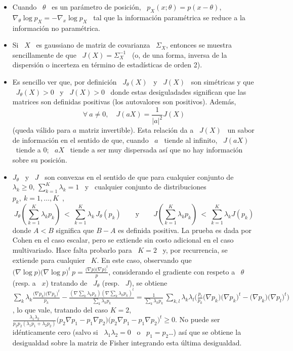 \begin{itemize}
\item Cuando  \ $\theta$ \ es  un par\'ametro de posici\'on,  \ $p_X(x;\theta) =
  p(x - \theta)$, \ $\nabla_\theta \log p_X  = - \nabla_x \log p_X$ \ tal que la
  informaci\'on param\'etrica se reduce a la informaci\'on no param\'etrica.
%
\item Si \ $X$ \ es gaussiano  de matriz de covarianza \ $\Sigma_X$, entonces se
  muestra sencillamente  de que  \ $J(X)  = \Sigma_X^{-1}$ \  (o, de  una forma,
  inversa de la dispersi\'on o incerteza en t\'ermino de estad\'isticas de orden
  2).
%
\item Es sencillo ver  que, por definici\'on \ $J_\theta(X)$ \ y  \ $J(X)$ \ son
  sim\'etricas  y  que \  $J_\theta(X)  > 0$  \  y  \ $J(X)  >  0$  \ donde  estas
  desiguladades  significan  que  las  matrices  son  definidas  positivas  (los
  autovalores son positivos).  Adem\'as,
  \[
  \forall \ a \ne 0, \quad J(aX) = \frac{1}{|a|^2} J(X)
  \]
  (queda v\'alido para $a$ matriz invertible).   Esta relaci\'on da a \ $J(X)$ \
  un sabor  de informaci\'on  en el  sentido de que,  cuando \  $a$ \  tiende al
  infinito, \ $J(aX)$ \ tiende a 0; \  $a X$ \ tiende a ser muy dispersada as\'i
  que no hay informaci\'on sobre su posici\'on.
%
\item $J_\theta$ \  y \ $J$ \ son  convexas en el sentido de  que para cualquier
  conjunto de \ $\lambda_k \ge 0, \, \sum_{k=1}^K \lambda_k = 1$ \ y \ cualquier
  conjunto de distribuciones \ $p_k, \ k = 1, \ldots , K$~\cite{Coh68, Fri04},
  \[
  J_\theta\left(  \sum_{k=1}^K  \lambda_k  p_k  \right)  \:  <  \:  \sum_{k=1}^K
  \lambda_k  \,  J_\theta\left(  p_k  \right)  \qquad  \mbox{y}  \qquad  J\left(
    \sum_{k=1}^K \lambda_k  p_k \right) \:  < \: \sum_{k=1}^K  \lambda_k J\left(
    p_k \right)
  \]
  donde $A < B$ significa que $B-A$ es definida positiva.  La prueba es dada por
  Cohen en  el caso  escalar, pero se  extiende sin  costo adicional en  el caso
  multivariado.  Hace falta  probarlo  para \  $K=2$  \ y,  por recurrencia,  se
  extiende para  cualquier \ $K$. En  este caso, observando que  \ $\big( \nabla
  \log p  \big) \big( \nabla \log  p \big)^t \,  p = \frac{\big( \nabla  p \big)
    \big(  \nabla p  \big)^t}{p}$, considerando  el  gradiente con  respeto a  \
  $\theta$ (resp. a \ $x$) tratando de  \ $J_\theta$ (resp. \ $J$), se obtiene \
  $\sum_k \lambda_k \frac{\big( \nabla  p_k \big) \big( \nabla p_k \big)^t}{p_k}
  -  \frac{\left(  \nabla \sum_k  \lambda_k  p_k  \right)  \left( \nabla  \sum_k
      \lambda_k p_k \right)^t}{\sum_k \lambda_k p_k} = \frac{1}{\sum_k \lambda_k
    p_k} \,  \sum_{k,l} \lambda_k  \lambda_l \Big( \frac{p_l}{p_k}  \big( \nabla
  p_k \big) \big(  \nabla p_k \big)^t - \big( \nabla p_k  \big) \big( \nabla p_l
  \big)^t \Big)$,  lo que vale, tratando del  caso $K = 2$,  \ $ \frac{\lambda_1
    \lambda_2}{p_2 p_2 (\lambda_1  p_1 + \lambda_2 p_2)} \big(  p_2 \nabla p_1 -
  p_1 \nabla p_2 \big) \big( p_2 \nabla  p_1 - p_1 \nabla p_2 \big)^t \ge 0$. No
  puede ser  id\'enticamente cero (salvo  si \ $\lambda_1  \lambda_2 = 0$ \  o \
  $p_1 =  p_2$\ldots) as\'i  que se  obtiene la desigualdad  sobre la  matriz de
  Fisher integrando esta \'ultima desigualdad.
\end{itemize}


